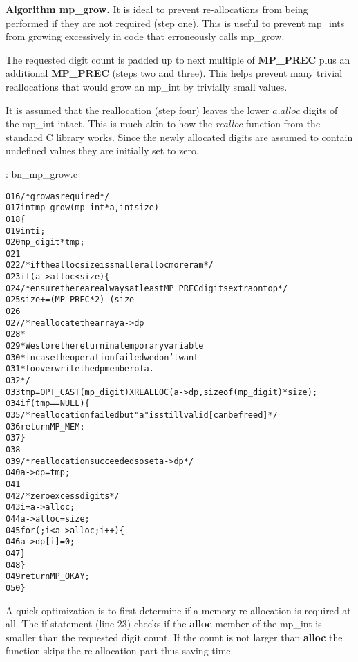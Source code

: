 \documentclass[b5paper]{book}
\begin{document}
\textbf{Algorithm mp\_grow.}
It is ideal to prevent re-allocations from being performed if they are not required (step one).  This is useful to 
prevent mp\_ints from growing excessively in code that erroneously calls mp\_grow.  

The requested digit count is padded up to next multiple of \textbf{MP\_PREC} plus an additional \textbf{MP\_PREC} (steps two and three).  
This helps prevent many trivial reallocations that would grow an mp\_int by trivially small values.  

It is assumed that the reallocation (step four) leaves the lower $a.alloc$ digits of the mp\_int intact.  This is much 
akin to how the \textit{realloc} function from the standard C library works.  Since the newly allocated digits are 
assumed to contain undefined values they are initially set to zero.

\vspace{+3mm}\begin{small}
\hspace{-5.1mm}{\bf File}: bn\_mp\_grow.c
\vspace{-3mm}
\begin{alltt}
016   /* grow as required */
017   int mp_grow (mp_int * a, int size)
018   \{
019     int     i;
020     mp_digit *tmp;
021   
022     /* if the alloc size is smaller alloc more ram */
023     if (a->alloc < size) \{
024       /* ensure there are always at least MP_PREC digits extra on top */
025       size += (MP_PREC * 2) - (size % MP_PREC);
026   
027       /* reallocate the array a->dp
028        *
029        * We store the return in a temporary variable
030        * in case the operation failed we don't want
031        * to overwrite the dp member of a.
032        */
033       tmp = OPT_CAST(mp_digit) XREALLOC (a->dp, sizeof (mp_digit) * size);
034       if (tmp == NULL) \{
035         /* reallocation failed but "a" is still valid [can be freed] */
036         return MP_MEM;
037       \}
038   
039       /* reallocation succeeded so set a->dp */
040       a->dp = tmp;
041   
042       /* zero excess digits */
043       i        = a->alloc;
044       a->alloc = size;
045       for (; i < a->alloc; i++) \{
046         a->dp[i] = 0;
047       \}
048     \}
049     return MP_OKAY;
050   \}
\end{alltt}
\end{small}

A quick optimization is to first determine if a memory re-allocation is required at all.  The if statement (line 23) checks
if the \textbf{alloc} member of the mp\_int is smaller than the requested digit count.  If the count is not larger than \textbf{alloc}
the function skips the re-allocation part thus saving time.
\end{document}
